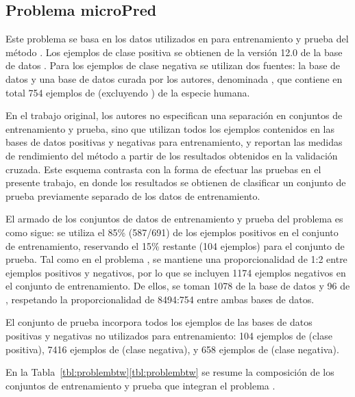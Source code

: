 %
%
\subsection{Problema microPred}
%
Este problema se basa en los datos utilizados en \cite{batuwita} para
entrenamiento y prueba del método \work{\micropred}.
Los ejemplos de clase positiva se obtienen de la versión 12.0 de la
base de datos \work{\mirbase}.
Para los ejemplos de clase negativa se utilizan dos fuentes: la base
de datos  y una base de datos curada por los autores,
denominada , que contiene en total 754
ejemplos de  (excluyendo ) de la especie humana.

En el trabajo original, los autores no especifican una separación
en conjuntos de entrenamiento y prueba, sino que utilizan todos los
ejemplos contenidos en las bases de datos positivas y negativas para
entrenamiento, y reportan las medidas de rendimiento del método
a partir de los resultados obtenidos en la validación cruzada.
Este esquema contrasta con la forma de efectuar las pruebas en el
presente trabajo, en donde los resultados se obtienen de clasificar un
conjunto de prueba previamente separado de los datos de
entrenamiento.

El armado de los conjuntos de datos de entrenamiento y prueba del
problema \prob\micropred{} es como sigue:
se utiliza el 85\% (587/691) de los ejemplos positivos en el conjunto
de entrenamiento, reservando el 15\% restante (104 ejemplos) para el
conjunto de prueba.
Tal como en el problema \prob{\mipred}, se mantiene una
proporcionalidad de 1:2 entre ejemplos positivos y negativos, por lo
que se incluyen 1174 ejemplos negativos en el conjunto de
entrenamiento.
De ellos, se toman 1078 de la base de datos  y 96
de , respetando la proporcionalidad de
8494:754 entre ambas bases de datos.

El conjunto de prueba incorpora todos los ejemplos de las bases de
datos positivas y negativas no utilizados para entrenamiento: 104
ejemplos de  (clase positiva), 7416 ejemplos de
 (clase negativa), y 658 ejemplos de  (clase negativa).

En la \iflatexml{}Tabla~\ref{tbl:problembtw}\else\autoref{tbl:problembtw}\fi{}
se resume la composición de los conjuntos de entrenamiento y prueba
que integran el problema \prob\micropred.
